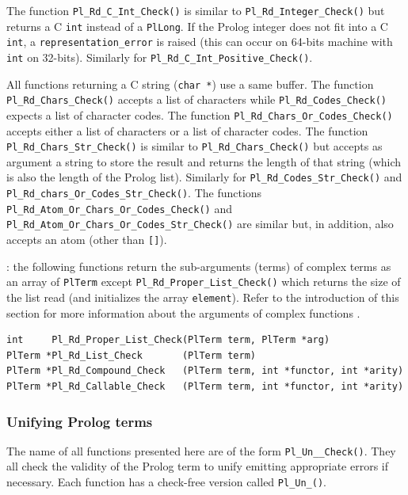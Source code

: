 The function \texttt{Pl\_Rd\_C\_Int\_Check()} is similar to
\texttt{Pl\_Rd\_Integer\_Check()} but returns a C \texttt{int} instead
of a \texttt{PlLong}. If the Prolog integer does not fit into a C
\texttt{int}, a \texttt{representation\_error} is raised (this can
occur on 64-bits machine with \texttt{int} on 32-bits). Similarly for
\texttt{Pl\_Rd\_C\_Int\_Positive\_Check()}.
  
All functions returning a C string (\texttt{char *}) use a same
buffer. The function \texttt{Pl\_Rd\_Chars\_Check()} accepts a list of
characters while \texttt{Pl\_Rd\_Codes\_Check()} expects a list of
character codes. The function
\texttt{Pl\_Rd\_Chars\_Or\_Codes\_Check()} accepts either a list of
characters or a list of character codes. The function
\texttt{Pl\_Rd\_Chars\_Str\_Check()} is similar to
\texttt{Pl\_Rd\_Chars\_Check()} but accepts as argument a string to
store the result and returns the length of that string (which is also
the length of the Prolog list). Similarly for
\texttt{Pl\_Rd\_Codes\_Str\_Check()} and 
\texttt{Pl\_Rd\_chars\_Or\_Codes\_Str\_Check()}. The functions \texttt{Pl\_Rd\_Atom\_Or\_Chars\_Or\_Codes\_Check()}
and \texttt{Pl\_Rd\_Atom\_Or\_Chars\_Or\_Codes\_Str\_Check()} are similar but, in addition, also accepts an atom (other than \texttt{[]}). 

: the following functions return the sub-arguments
(terms) of complex terms as an array of \texttt{PlTerm} except
\texttt{Pl\_Rd\_Proper\_List\_Check()} which returns the size of the list read
(and initializes the array \texttt{element}). Refer to the introduction of
this section for more information about the arguments of complex functions
.

\begin{Code}
\begin{verbatim}
int     Pl_Rd_Proper_List_Check(PlTerm term, PlTerm *arg)
PlTerm *Pl_Rd_List_Check       (PlTerm term)
PlTerm *Pl_Rd_Compound_Check   (PlTerm term, int *functor, int *arity)
PlTerm *Pl_Rd_Callable_Check   (PlTerm term, int *functor, int *arity)
\end{verbatim}
\end{Code}

\subsubsection{Unifying Prolog terms}
The name of all functions presented here are of the form
\texttt{Pl\_Un\_\_Check()}. They all check the validity of the
Prolog term to unify emitting appropriate errors if necessary. Each function
has a check-free version called \texttt{Pl\_Un\_()}.

